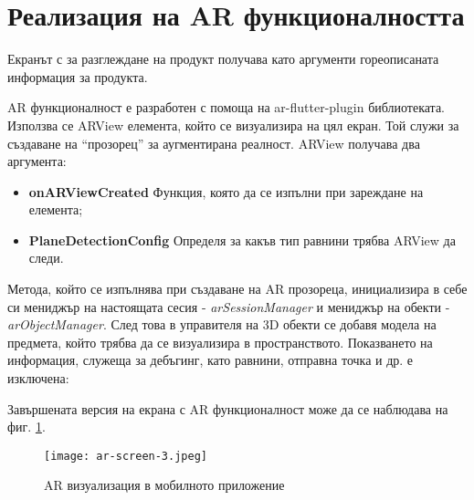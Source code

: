 \section{Реализация на AR функционалността}
Екранът с за разглеждане на продукт получава като аргументи гореописаната информация за продукта.



AR функционалност е разработен с помоща на ar-flutter-plugin библиотеката. Използва се ARView елемента, който се визуализира на цял екран. Той служи за създаване на ``прозорец'' за аугментирана реалност. ARView получава два аргумента:

\begin{itemize}
    \item \textbf{onARViewCreated}
    Функция, която да се изпълни при зареждане на елемента;
    \item \textbf{PlaneDetectionConfig}
    Определя за какъв тип равнини трябва ARView да следи.
\end{itemize}



Метода, който се изпълнява при създаване на AR прозореца, инициализира в себе си мениджър на настоящата сесия - \emph{arSessionManager} и мениджър на обекти - \emph{arObjectManager}. След това в управителя на 3D обекти се добавя модела на предмета, който трябва да се визуализира в пространството. Показването на информация, служеща за дебъгинг, като равнини, отправна точка и др. е изключена:



Завършената версия на екрана с AR функционалност може да се наблюдава на фиг. \ref{fig:ar-screen-in-3}.

\begin{figure}[H]
    \texttt{[image: ar-screen-3.jpeg]}
    \centering
    \caption{AR визуализация в мобилното приложение}
    \label{fig:ar-screen-in-3}
\end{figure}